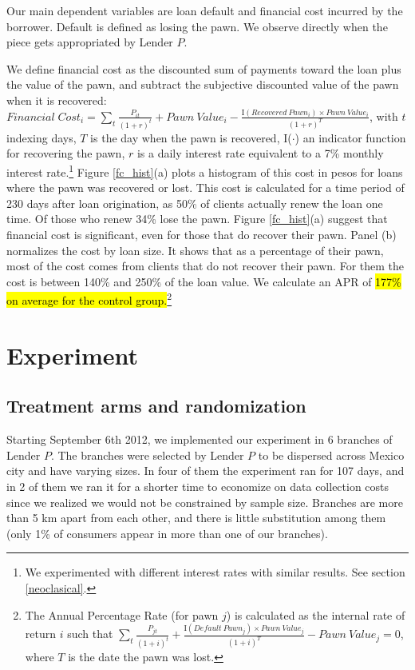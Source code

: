 \documentclass[11pt]{article}
\begin{document}
Our main dependent variables are loan default and financial cost incurred by the borrower. Default is defined as losing the pawn. We observe directly when the piece gets appropriated by Lender $P$. 

We define financial cost as the discounted sum of payments toward the loan plus the value of the pawn, and subtract the subjective discounted value of the pawn when it is recovered: $Financial \; Cost_i = \sum_t \frac{P_{it}}{(1+r)^t} + Pawn \: Value_i - \frac{\text{I}(Recovered \: Pawn_i) \times Pawn \: Value_i}{(1+r)^T}$, with $t$ indexing days, $T$ is the day when the pawn is recovered, I($\cdot$) an indicator function for recovering the pawn, $r$ is a daily interest rate equivalent to a 7\% monthly interest rate.\footnote{We experimented with different interest rates with similar results. See section \ref{neoclasical}.} Figure \ref{fc_hist}(a) plots a histogram of this cost in pesos for loans where the pawn was recovered or lost. This cost is calculated for a time period of 230 days after loan origination, as 50\% of clients actually renew the loan one time. Of those who renew 34\% lose the pawn. Figure \ref{fc_hist}(a) suggest that financial cost is significant, even for those that do recover their pawn.  Panel (b) normalizes the cost by loan size. It shows that as a percentage of their pawn, most of the cost comes from clients that do not recover their pawn. For them the cost is between 140\% and 250\% of the loan value. %
We calculate an APR of \hl{177\% on average for the control group.}\footnote{The Annual Percentage Rate (for pawn $j$) is calculated as the internal rate of return $i$ such that $\sum_t \frac{P_{jt}}{(1+i)^t} + \frac{\text{I}(Default \: Pawn_j) \times Pawn \: Value_j}{(1+i)^T} - Pawn \: Value_j = 0$, where $T$ is the date the pawn was lost.}


\section{Experiment} \label{Experiment}

\subsection{Treatment arms and randomization}

\noindent {} Starting September 6th 2012, we implemented our experiment in 6 branches of Lender $P$. The branches were selected by Lender $P$ to be dispersed across Mexico city and have varying sizes. In four of them the experiment ran for 107 days, and in 2 of them we ran it for a shorter time to economize on data collection costs since we realized we would not be constrained by sample size. %
Branches are more than 5 km apart from each other, and there is little substitution among them (only 1\% of consumers appear in more than one of our branches).
\end{document}
